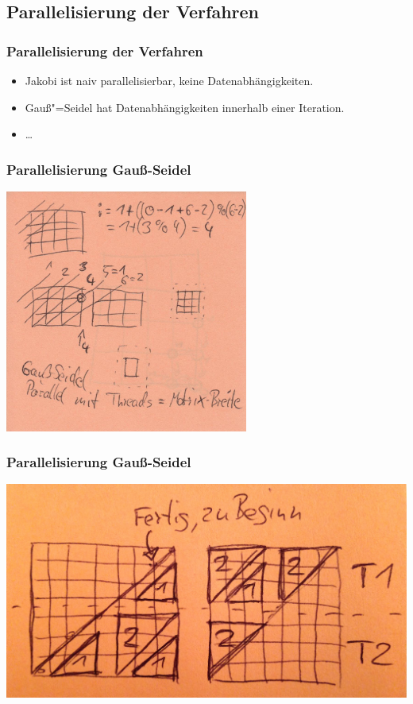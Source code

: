 \documentclass{beamer}
\begin{document}
\subsection{Parallelisierung der Verfahren}
\begin{frame}
    \frametitle{Parallelisierung der Verfahren}
    \begin{itemize}
        \item Jakobi ist naiv parallelisierbar, keine Datenabhängigkeiten.
        \item Gauß"=Seidel hat Datenabhängigkeiten innerhalb einer Iteration.
        \item \dots
    \end{itemize}
\end{frame}

\begin{frame}
    \frametitle{Parallelisierung Gauß-Seidel}
    \includegraphics[width=0.6\textwidth]{gaussseidelskizze}
\end{frame}

\begin{frame}
    \frametitle{Parallelisierung Gauß-Seidel}
    \includegraphics[width=\textwidth]{gaussseideldreiecke}
\end{frame}
\end{document}

